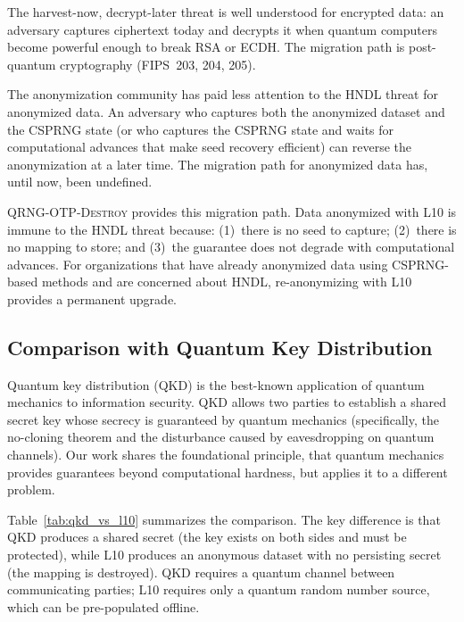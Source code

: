 \documentclass[journal]{IEEEtran}
\begin{document}
The harvest-now, decrypt-later threat is well understood for encrypted data: an adversary captures ciphertext today and decrypts it when quantum computers become powerful enough to break RSA or ECDH. The migration path is post-quantum cryptography (FIPS~203, 204, 205).

The anonymization community has paid less attention to the HNDL threat for anonymized data. An adversary who captures both the anonymized dataset and the CSPRNG state (or who captures the CSPRNG state and waits for computational advances that make seed recovery efficient) can reverse the anonymization at a later time. The migration path for anonymized data has, until now, been undefined.

\textsc{QRNG-OTP-Destroy} provides this migration path. Data anonymized with L10 is immune to the HNDL threat because: (1)~there is no seed to capture; (2)~there is no mapping to store; and (3)~the guarantee does not degrade with computational advances. For organizations that have already anonymized data using CSPRNG-based methods and are concerned about HNDL, re-anonymizing with L10 provides a permanent upgrade.

\subsection{Comparison with Quantum Key Distribution}
\label{subsec:qkd_comparison}

Quantum key distribution (QKD) is the best-known application of quantum mechanics to information security. QKD allows two parties to establish a shared secret key whose secrecy is guaranteed by quantum mechanics (specifically, the no-cloning theorem and the disturbance caused by eavesdropping on quantum channels). Our work shares the foundational principle, that quantum mechanics provides guarantees beyond computational hardness, but applies it to a different problem.

Table~\ref{tab:qkd_vs_l10} summarizes the comparison. The key difference is that QKD produces a shared secret (the key exists on both sides and must be protected), while L10 produces an anonymous dataset with no persisting secret (the mapping is destroyed). QKD requires a quantum channel between communicating parties; L10 requires only a quantum random number source, which can be pre-populated offline.
\end{document}
